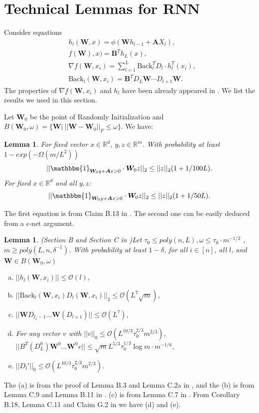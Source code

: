\documentclass{article}
\newcommand{\cO}{\mathcal{O}}
\newtheorem{lem}[theo]{\textbf{Lemma}}
\begin{document}
\section{Technical Lemmas for RNN}
Consider equations
\begin{equation}
\begin{aligned}
&h_{l}(\bm{W},x)=\phi(\bm{W}h_{l-1}+\bm{A}X_l),\\
&f(\bm{W}),x)=\bm{B}^Th_L(x),\\
&\nabla f(\bm{W},x_i)=\sum_{l=1}^L\text{Back}^T_lD_l\cdot h_l^T(x_i),\\
&\text{Back}_l(\bm{W},x_i)=\bm{B}^TD_L\bm{W}\cdots D_{l+1}\bm{W}.
\end{aligned}
\end{equation}
The properties of $\nabla f(\bm{W},x_i)$ and $h_l$ have been already appeared in \cite{rate}. We list the results we used in this section.

Let $\bm{W}_0$ be the point of Randomly Initialization and $B(\bm{W}_0,\omega)=\{\bm{W}|\ ||\bm{W}-\bm{W}_0||_F\leq \omega\}$. We have:
\begin{lem}\label{bt}
For fixed vector $x\in \mathbb{R}^d$, $y, z\in \mathbb{R}^m$. With probability at least $1-exp(-\Omega(m/L^2))$
\begin{equation}
||\mathbbm{1}_{\bm{W}_0y+\bm{A}x>0} \cdot \bm{W}_0z||_2\leq ||z||_2(1+1/100L).
\end{equation}
For fixed $x\in \mathbb{R}^d$ and all $y,z$:
\begin{equation}
||\mathbbm{1}_{\bm{W}_0y+\bm{A}x>0} \cdot \bm{W}_0z||_2\leq ||z||_2(1+1/50L).
\end{equation}
\end{lem}
The first equation is from Claim B.13 in \cite{rate}. The second one can be easily deduced from a $\epsilon$-net argument.


\begin{lem}(Section B and Section C in \cite{rate})\label{elem}
Let $ \tau_0\leq poly(n,L), \omega\leq  \tau_0\cdot m^{-1/2}$ , $m\geq poly(L,n,\delta^{-1})$. With probability at least $1-\delta$, for all $i\in [n]$, all $l$, and $\bm{W} \in B(\bm{W}_0,\omega)$
\begin{enumerate}[(a)]
\item $||h_l(\bm{W},x_i)||\leq \cO(l)$,
\item $||\text{Back}_l(\bm{W}, x_i)D_l(\bm{W}, x_i)||_2\leq \cO(L^7\sqrt{m})$,
\item $||\bm{W}D_{l_1-1}...\bm{W}(D_{l+1})||\leq \cO(L^7)$,
\item For any vector $v$ with $||v||_0\leq\cO(L^{10/3}\tau_0^{2/3}m^{2/3})$, $||B^T(D^0_L)\bm{W}^0...\bm{W}^0v|| \leq  \sqrt{m}L^{5/3}\tau_0^{1/3}\log m\cdot m^{-1/6} $,
\item $ ||D_l'||_0\leq  \cO(L^{10/3}\tau_0^{2/3}m^{2/3}).$
\end{enumerate}
\end{lem}
The (a) is from the proof of Lemma B.3 and Lemma C.2a in \cite{rate}, and the (b) is from Lemma C.9 and Lemma B.11  in \cite{rate}. (c) is from Lemma C.7 in \cite{rate}. From Corollary B.18, Lemma C.11 and Claim G.2 in \cite{rate} we have (d) and (e).
\end{document}
